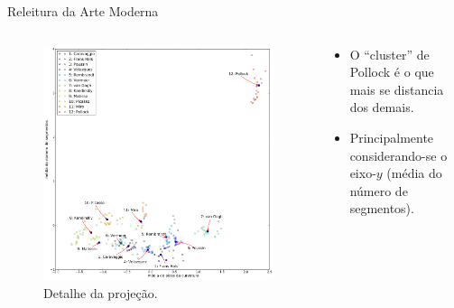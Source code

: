 \documentclass{beamer}
\begin{document}
\begin{frame}{Releitura da Arte Moderna}

\begin{columns}
 \begin{column}{.49\textwidth}
\begin{figure}[h!]
  \begin{center}
    \includegraphics[width=\columnwidth]{figs/caso1_g1}
    \caption{Detalhe da projeção.}
\end{center}
\end{figure}
 \end{column}

 \begin{column}{.49\textwidth}
  \begin{itemize}
    \item O ``cluster'' de Pollock é o que mais se distancia dos demais.

    \item Principalmente considerando-se o eixo-$y$ (média do número de segmentos).
  \end{itemize}
 \end{column}
\end{columns}

\end{frame}


\end{document}
